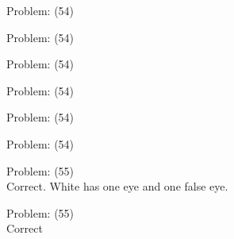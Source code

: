 \documentclass[11pt]{article}
\begin{document}
\begin{minipage}[t]{0.5\textwidth}
  {\centering
  
Problem: (54)\\
  }
\end{minipage}
\begin{minipage}[t]{0.5\textwidth}
  {\centering
  
Problem: (54)\\
  }
\end{minipage}
\begin{minipage}[t]{0.5\textwidth}
  {\centering
  
Problem: (54)\\
  }
\end{minipage}
\begin{minipage}[t]{0.5\textwidth}
  {\centering
  
Problem: (54)\\
  }
\end{minipage}
\begin{minipage}[t]{0.5\textwidth}
  {\centering
  
Problem: (54)\\
  }
\end{minipage}
\begin{minipage}[t]{0.5\textwidth}
  {\centering
  
Problem: (54)\\
  }
\end{minipage}
\begin{minipage}[t]{0.5\textwidth}
  {\centering
  
Problem: (55)\\
Correct. White has one eye and one false eye.\\
  }
\end{minipage}
\begin{minipage}[t]{0.5\textwidth}
  {\centering
  
Problem: (55)\\
Correct\\
  }
\end{minipage}
\end{document}
